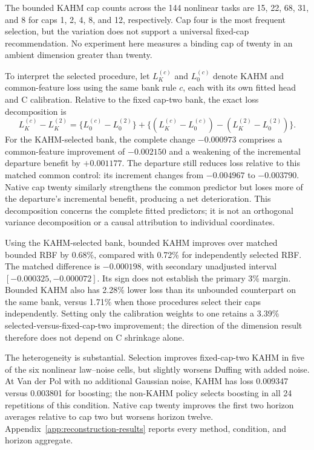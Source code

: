 The bounded KAHM cap counts across the 144 nonlinear tasks are
15, 22, 68, 31, and 8 for caps 1, 2, 4, 8, and 12, respectively.
Cap four is the most frequent selection, but the variation does not support
a universal fixed-cap recommendation. No experiment here measures a
binding cap of twenty in an ambient dimension greater than twenty.

To interpret the selected procedure, let $L_K^{(c)}$ and $L_0^{(c)}$
denote KAHM and common-feature loss using the same bank rule $c$, each
with its own fitted head and C calibration. Relative to the fixed cap-two
bank, the exact loss decomposition is
\[
 L_K^{(c)}-L_K^{(2)}
 =\{L_0^{(c)}-L_0^{(2)}\}
  +\{(L_K^{(c)}-L_0^{(c)})-(L_K^{(2)}-L_0^{(2)})\}.
\]
For the KAHM-selected bank, the complete change $-0.000973$ comprises
a common-feature improvement of $-0.002150$ and a weakening of the
incremental departure benefit by $+0.001177$. The departure still reduces
loss relative to this matched common control: its increment changes from
$-0.004967$ to $-0.003790$. Native cap twenty similarly strengthens the
common predictor but loses more of the departure's incremental benefit,
producing a net deterioration. This decomposition concerns the complete
fitted predictors; it is not an orthogonal variance decomposition or a
causal attribution to individual coordinates.

Using the KAHM-selected bank, bounded KAHM improves over matched bounded
RBF by 0.68\%, compared with 0.72\% for independently selected RBF.
The matched difference is $-0.000198$, with secondary unadjusted interval
$[-0.000325,-0.000072]$. Its sign does not establish the primary 3\%
margin. Bounded KAHM also has 2.28\% lower loss than its unbounded
counterpart on the same bank, versus 1.71\% when those procedures select
their caps independently. Setting only the calibration weights to one
retains a 3.39\% selected-versus-fixed-cap-two improvement; the direction
of the dimension result therefore does not depend on C shrinkage alone.

The heterogeneity is substantial. Selection improves fixed-cap-two KAHM
in five of the six nonlinear law--noise cells, but slightly worsens Duffing
with added noise. At Van der Pol with no additional Gaussian noise,
KAHM has loss 0.009347 versus 0.003801 for boosting; the non-KAHM policy
selects boosting in all 24 repetitions of this condition. Native cap
twenty improves the first two horizon averages relative to cap two but
worsens horizon twelve. Appendix~\ref{app:reconstruction-results}
reports every method, condition, and horizon aggregate.

